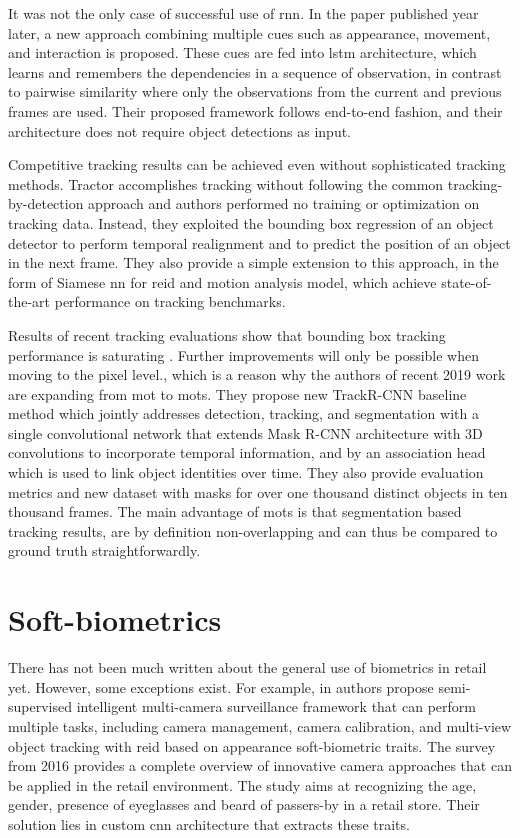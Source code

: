     It was not the only case of successful use of \gls{rnn}. In the paper \cite{sadeghian2017tracking} published year later, a new approach combining multiple cues such as appearance, movement, and interaction is proposed. These cues are fed into \gls{lstm} \cite{hochreiter1997long} architecture, which learns and remembers the dependencies in a sequence of observation, in contrast to pairwise similarity where only the observations from the current and previous frames are used. Their proposed framework follows end-to-end fashion, and their architecture does not require object detections as input.
    
    Competitive tracking results can be achieved even without sophisticated tracking methods. Tractor \cite{DBLP:journals/corr/abs-1903-05625} accomplishes tracking without following the common tracking-by-detection approach and authors performed no training or optimization on tracking data. Instead, they exploited the bounding box regression of an object detector to perform temporal realignment and to predict the position of an object in the next frame. They also provide a simple extension to this approach, in the form of Siamese \gls{nn} for \gls{reid} and motion analysis model, which achieve state-of-the-art performance on tracking benchmarks. 
    
    Results of recent tracking evaluations show that bounding box tracking performance is saturating \cite{mot16}. Further improvements will only be possible when moving to the pixel level., which is a reason why the authors of recent 2019 work \cite{DBLP:journals/corr/abs-1902-03604} are expanding from \gls{mot} to \gls{mots}. They propose new TrackR-CNN baseline method which jointly addresses detection, tracking, and segmentation with a single convolutional network that extends Mask R-CNN architecture with 3D convolutions to incorporate temporal information, and by an association head which is used to link object identities over time. They also provide evaluation metrics and new dataset with masks for over one thousand distinct objects in ten thousand frames. The main advantage of \gls{mots} is that segmentation based tracking results, are by definition non-overlapping and can thus be compared to ground truth straightforwardly.
    
\section{Soft-biometrics}
    There has not been much written about the general use of biometrics in retail yet. However, some exceptions exist. For example, in \cite{fookes2010semi} authors propose semi-supervised intelligent multi-camera surveillance framework that can perform multiple tasks, including camera management, camera calibration, and multi-view object tracking with \gls{reid} based on appearance soft-biometric traits. The survey \cite{quintana2016improving} from 2016 provides a complete overview of innovative camera approaches that can be applied in the retail environment. The study \cite{de2018comparative} aims at recognizing the age, gender, presence of eyeglasses and beard of passers-by in a retail store. Their solution lies in custom \gls{cnn} architecture that extracts these traits.
    
